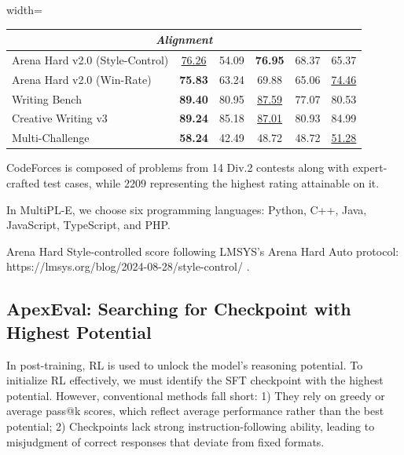 \begin{table}[t]
\begin{adjustbox}{width=\linewidth}
\begin{threeparttable}
\begin{tabular}{lccccc}
\midrule \multicolumn{6}{c}{\textit{Alignment}} \\
\midrule Arena Hard v2.0 (Style-Control)\tnote{3} & \underline{76.26} & 54.09 & \textbf{76.95} & 68.37 & 65.37 \\
 Arena Hard v2.0 (Win-Rate) & \textbf{75.83}  & 63.24 & 69.88 & 65.06 & \underline{74.46} \\
 Writing Bench & \textbf{89.40}  & 80.95 & \underline{87.59} & 77.07 & 80.53 \\
 Creative Writing v3 & \textbf{89.24} & 85.18 & \underline{87.01} & 80.93 & 84.99 \\
Multi-Challenge & \textbf{58.24} & 42.49 & 48.72 & 48.72 & \underline{51.28} \\
\hline
\end{tabular}
\begin{tablenotes}
        \footnotesize
        \item[1] CodeForces is composed of problems from 14 Div.2 contests along with expert-crafted test cases, while $2209$ representing the highest rating attainable on it.
        \item[2] In MultiPL-E, we choose six programming languages: Python, C++, Java, JavaScript, TypeScript, and PHP.
        \item[3] Arena Hard Style-controlled score following LMSYS’s Arena Hard Auto protocol: https://lmsys.org/blog/2024-08-28/style-control/ .
    \end{tablenotes}
\end{threeparttable}
\end{adjustbox}
\end{table}

\subsection{ApexEval: Searching for Checkpoint with Highest Potential}
\label{ApexEval}

In post-training, RL is used to unlock the model’s reasoning potential. To initialize RL effectively, we must identify the SFT checkpoint with the highest potential. However, conventional methods fall short: 1) They rely on greedy or average pass@k scores, which reflect average performance rather than the best potential; 2) Checkpoints lack strong instruction-following ability, leading to misjudgment of correct responses that deviate from fixed formats.

